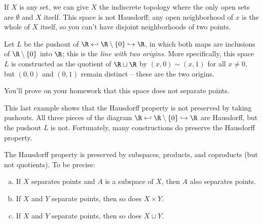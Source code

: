 \documentclass[noname]{notes}
\begin{document}
\begin{example}
	If $X$ is any set, we can give $X$ the indiscrete topology where the only open sets are $\emptyset$ and $X$ itself. This space is not Hausdorff; any open neighborhood of $x$ is the whole of $X$ itself, so you can't have disjoint neighborhoods of two points.  
\end{example}

\begin{example}
	Let $L$ be the pushout of $\R \hookleftarrow \R \setminus \{0\} \hookrightarrow \R$, in which both maps are inclusions of $\R \setminus\{0\}$ into $\R$; this is the \emph{line with two origins}. More specifically, this space $L$ is constructed as the quotient of $\R \sqcup \R$ by $(x,0) \sim (x,1)$ for all $x \neq 0$, but $(0,0)$ and $(0,1)$ remain distinct -- these are the two origins.
	
	You'll prove on your homework that this space does not separate points. 
\end{example}

This last example shows that the Hausdorff property is not preserved by taking pushouts. All three pieces of the diagram $\R \hookleftarrow \R \setminus \{0\} \hookrightarrow \R$ are Hausdorff, but the pushout $L$ is not. Fortunately, many constructions do preserve the Hausdorff property. 

\begin{lemma}
	The Hausdorff property is preserved by subspaces, products, and coproducts (but not quotients). To be precise:
	\begin{enumerate}[(a)]
		\item If $X$ separates points and $A$ is a subspace of $X$, then $A$ also separates points.
		\item If $X$ and $Y$ separate points, then so does $X \times Y$. 
		\item If $X$ and $Y$ separate points, then so does $X \sqcup Y$.
	\end{enumerate}
\end{lemma}
\end{document}
